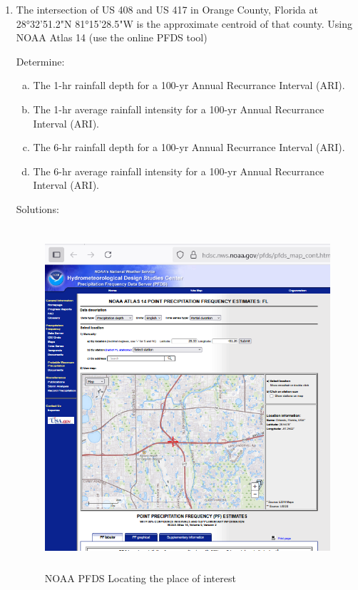 \documentclass[12pt]{article}
\begin{document}
\begin{enumerate}
\clearpage

\item The intersection of US 408 and US 417 in Orange County, Florida at 28°32'51.2"N 81°15'28.5"W is the approximate centroid of that county. Using NOAA Atlas 14 (use the online PFDS tool)

Determine:
    \begin{enumerate}[a)]
        \item The 1-hr rainfall depth for a 100-yr Annual Recurrance Interval (ARI). 
        \item The 1-hr average rainfall intensity for a 100-yr Annual Recurrance Interval (ARI). 
        \item The 6-hr rainfall depth for a 100-yr Annual Recurrance Interval (ARI). 
        \item The 6-hr average rainfall intensity for a 100-yr Annual Recurrance Interval (ARI). 
    \end{enumerate}

Solutions:

\begin{figure}[h!] %
   \centering
   \includegraphics[height=5in]{pfds-1.png} 
   \caption{NOAA PFDS Locating the place of interest}
   \label{fig:pfds-1}
\end{figure}


\end{enumerate}
\end{document}

